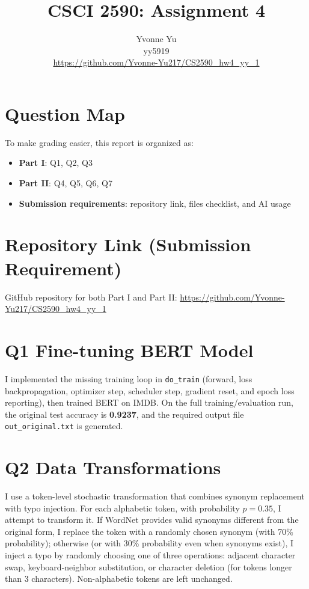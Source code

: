 \documentclass{article}
\title{CSCI 2590: Assignment 4}
\author{Yvonne Yu \\ yy5919 \\ \href{https://github.com/Yvonne-Yu217/CS2590_hw4_yy_1}{https://github.com/Yvonne-Yu217/CS2590\_hw4\_yy\_1}}
\date{}
\begin{document}
\maketitle

\section*{Question Map}
To make grading easier, this report is organized as:
\begin{itemize}
  \item \textbf{Part I}: Q1, Q2, Q3
  \item \textbf{Part II}: Q4, Q5, Q6, Q7
  \item \textbf{Submission requirements}: repository link, files checklist, and AI usage
\end{itemize}

\section*{Repository Link (Submission Requirement)}
GitHub repository for both Part I and Part II:
\href{https://github.com/Yvonne-Yu217/CS2590_hw4_yy_1}{https://github.com/Yvonne-Yu217/CS2590\_hw4\_yy\_1}

\section*{Q1 Fine-tuning BERT Model}
I implemented the missing training loop in \texttt{do\_train} (forward, loss backpropagation,
optimizer step, scheduler step, gradient reset, and epoch loss reporting), then trained BERT on IMDB.
On the full training/evaluation run, the original test accuracy is \textbf{0.9237}, and the required
output file \texttt{out\_original.txt} is generated.

\section*{Q2 Data Transformations}
I use a token-level stochastic transformation that combines synonym replacement with typo injection.
For each alphabetic token, with probability $p=0.35$, I attempt to transform it. If WordNet provides
valid synonyms different from the original form, I replace the token with a randomly chosen synonym
(with 70\% probability); otherwise (or with 30\% probability even when synonyms exist), I inject a typo
by randomly choosing one of three operations: adjacent character swap, keyboard-neighbor substitution,
or character deletion (for tokens longer than 3 characters).
Non-alphabetic tokens are left unchanged.
\end{document}
